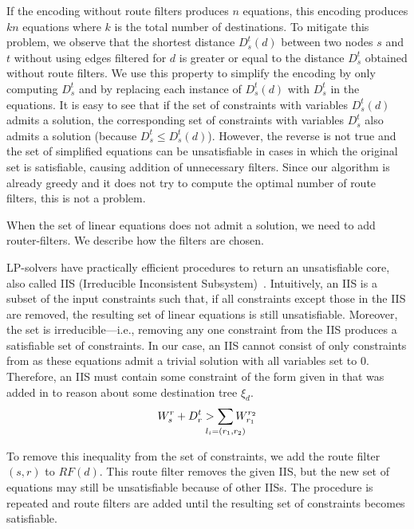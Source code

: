 If the encoding without route filters produces $n$ equations, this
encoding produces $kn$ equations where $k$ is the total number of destinations.  
To mitigate this problem, we observe that the shortest distance $D_s^t(d)$ between two
nodes $s$ and $t$ without using edges filtered for $d$ is
greater or equal to the distance $D_s^t$ obtained without route filters.  
We use this property to simplify the
encoding by only computing $D_s^t$ and by replacing each instance of
$D_s^t(d)$ with $D_s^t$ in the equations.  It is easy to see that 
if the set of constraints with variables $D_s^t(d)$ admits a solution,
the corresponding set of constraints with variables $D_s^t$ 
also admits a solution (because $D_s^t\leq
D_s^t(d)$).  However, the reverse is not true and the set of
simplified equations can be unsatisfiable in cases in which the
original set is satisfiable, causing addition of unnecessary filters.
Since our algorithm is already greedy and it does not try to compute the optimal 
number of route filters, this is not a problem.


When the set of linear equations does not admit a solution, we 
need to add router-filters. We describe how the filters are chosen.

LP-solvers have practically efficient procedures to return an
unsatisfiable core, also called IIS (Irreducible Inconsistent Subsystem)~\cite{chinneck2007feasibility}. 
Intuitively, an IIS is a subset of the input constraints such that,
if all constraints except those in the IIS are removed, the resulting set of
linear equations is still unsatisfiable. Moreover, the set is irreducible---i.e., removing 
any one constraint from the IIS produces a satisfiable set of constraints. 
In our case, an IIS cannot consist of only 
constraints from  as these equations
admit a trivial solution with all variables set to 0. 
Therefore, an IIS must contain some constraint of the form
given in  
that was added in to reason about some destination tree $\xi_d$.
\[
W_s^r + D_r^t  > \sum_{\mathclap{\substack{l_i=(r_1,r_2)}}} 
		W_{r_1}^{r_2}
\]		


To remove this inequality from the set of constraints, we add the route filter $(s,r)$ to $RF(d)$.
This route filter removes the given IIS, but the new set of equations may still be unsatisfiable because of other IISs. 
The procedure is repeated and route filters are added until the resulting set of constraints becomes satisfiable.




